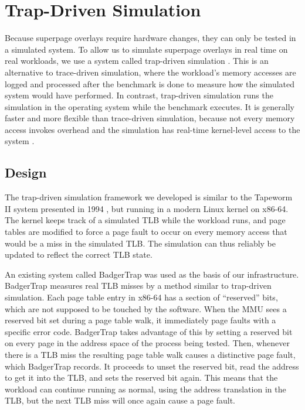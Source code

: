 \chapter{Trap-Driven Simulation}

Because superpage overlays require hardware changes, they can only be tested in a simulated system. To allow us to simulate superpage overlays in real time on real workloads, we use a system called trap-driven simulation \cite{Talluri}. This is an alternative to trace-driven simulation, where the workload's memory accesses are logged and processed after the benchmark is done to measure how the simulated system would have performed. In contrast, trap-driven simulation runs the simulation in the operating system while the benchmark executes. It is generally faster and more flexible than trace-driven simulation, because not every memory access invokes overhead and the simulation has real-time kernel-level access to the system \cite{Uhlig}.

\section{Design}
The trap-driven simulation framework we developed is similar to the Tapeworm II system presented in 1994 \cite{Uhlig}, but running in a modern Linux kernel on x86-64. The kernel keeps track of a simulated TLB while the workload runs, and page tables are modified to force a page fault to occur on every memory access that would be a miss in the simulated TLB. The simulation can thus reliably be updated to reflect the correct TLB state.

An existing system called BadgerTrap \cite{BadgerTrap} was used as the basis of our infrastructure. BadgerTrap measures real TLB misses by a method similar to trap-driven simulation. Each page table entry in x86-64 has a section of ``reserved'' bits, which are not supposed to be touched by the software. When the MMU sees a reserved bit set during a page table walk, it immediately page faults with a specific error code. BadgerTrap takes advantage of this by setting a reserved bit on every page in the address space of the process being tested. Then, whenever there is a TLB miss the resulting page table walk causes a distinctive page fault, which BadgerTrap records. It proceeds to unset the reserved bit, read the address to get it into the TLB, and sets the reserved bit again. This means that the workload can continue running as normal, using the address translation in the TLB, but the next TLB miss will once again cause a page fault.

